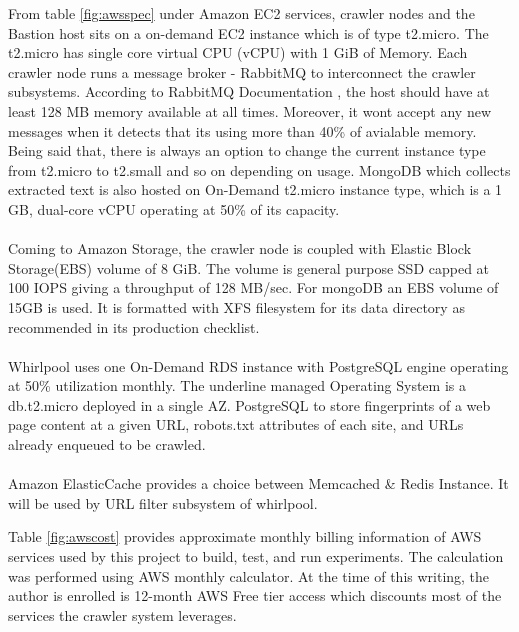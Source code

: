 \noindent
From table \ref{fig:awsspec} under Amazon EC2 services, crawler nodes and the Bastion host sits on a on-demand EC2 instance which is of type t2.micro. The t2.micro has single core virtual CPU (vCPU) with 1 GiB of Memory. Each crawler node runs a message broker - RabbitMQ to interconnect the crawler subsystems. According to RabbitMQ Documentation \cite{rabbitmq}, the host should have at least 128 MB memory available at all times. Moreover,
it wont accept any new messages when it detects that its using more than 40\% of avialable memory. Being
said that, there is always an option to change the current instance type from t2.micro to t2.small and so
on depending on usage. MongoDB which collects extracted text is also hosted on On-Demand t2.micro instance
type, which is a 1 GB, dual-core vCPU operating at 50\% of its capacity.
\\
\\
\noindent
Coming to Amazon Storage,  the crawler node is coupled with Elastic Block Storage(EBS) volume of 8 GiB.
The volume is general purpose SSD capped at 100 IOPS giving a throughput of 128 MB/sec. For mongoDB an
EBS volume of 15GB is used. It is formatted with XFS filesystem for its data directory as recommended in
its production checklist.
\\
\\
\noindent
Whirlpool uses one On-Demand RDS instance with PostgreSQL engine operating at 50\% utilization monthly. The underline managed Operating System is a db.t2.micro deployed in a single AZ. PostgreSQL to store fingerprints of a web page content at a given URL, robots.txt attributes of each site, and URLs already enqueued to be crawled.
\\
\\
Amazon ElasticCache provides a choice between Memcached \& Redis Instance. It will be used by URL filter
subsystem of whirlpool.

\pagebreak

\noindent
Table \ref{fig:awscost} provides approximate monthly billing information of AWS services used by this project to build, test, and run experiments. The calculation was performed using AWS monthly calculator. At the time of this writing, the author is enrolled is 12-month AWS Free tier access which discounts most of the services
the crawler system leverages.


